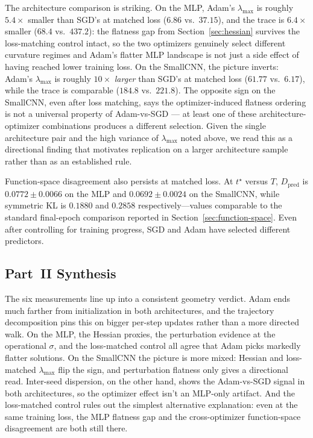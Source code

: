 \documentclass[11pt]{article}
\begin{document}
The architecture comparison is striking. On the MLP, Adam's $\lambda_{\max}$ is roughly $5.4\times$ smaller than SGD's at matched loss ($6.86$ vs.\ $37.15$), and the trace is $6.4\times$ smaller ($68.4$ vs.\ $437.2$): the flatness gap from Section~\ref{sec:hessian} survives the loss-matching control intact, so the two optimizers genuinely select different curvature regimes and Adam's flatter MLP landscape is not just a side effect of having reached lower training loss. On the SmallCNN, the picture inverts: Adam's $\lambda_{\max}$ is roughly $10\times$ \emph{larger} than SGD's at matched loss ($61.77$ vs.\ $6.17$), while the trace is comparable ($184.8$ vs.\ $221.8$). The opposite sign on the SmallCNN, even after loss matching, says the optimizer-induced flatness ordering is not a universal property of Adam-vs-SGD --- at least one of these architecture-optimizer combinations produces a different selection. Given the single architecture pair and the high variance of $\lambda_{\max}$ noted above, we read this as a directional finding that motivates replication on a larger architecture sample rather than as an established rule.

Function-space disagreement also persists at matched loss. At $t^\star$ versus $T$, $D_{\mathrm{pred}}$ is $0.0772 \pm 0.0066$ on the MLP and $0.0692 \pm 0.0024$ on the SmallCNN, while symmetric KL is $0.1880$ and $0.2858$ respectively---values comparable to the standard final-epoch comparison reported in Section~\ref{sec:function-space}. Even after controlling for training progress, SGD and Adam have selected different predictors.

\FloatBarrier

\subsection{Part~II Synthesis}
\label{sec:part2-synthesis}

The six measurements line up into a consistent geometry verdict. Adam ends much farther from initialization in both architectures, and the trajectory decomposition pins this on bigger per-step updates rather than a more directed walk. On the MLP, the Hessian proxies, the perturbation evidence at the operational $\sigma$, and the loss-matched control all agree that Adam picks markedly flatter solutions. On the SmallCNN the picture is more mixed: Hessian and loss-matched $\lambda_{\max}$ flip the sign, and perturbation flatness only gives a directional read. Inter-seed dispersion, on the other hand, shows the Adam-vs-SGD signal in both architectures, so the optimizer effect isn't an MLP-only artifact. And the loss-matched control rules out the simplest alternative explanation: even at the same training loss, the MLP flatness gap and the cross-optimizer function-space disagreement are both still there.
\end{document}
